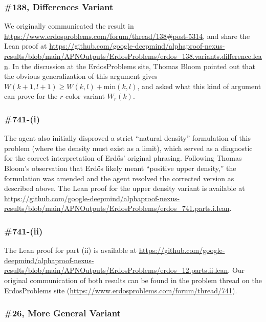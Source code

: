 \subsubsection*{{{\erdos} \#138, Differences Variant}}


We originally communicated the result in \url{https://www.erdosproblems.com/forum/thread/138#post-5314}, and share the Lean proof at \url{https://github.com/google-deepmind/alphaproof-nexus-results/blob/main/APNOutputs/ErdosProblems/erdos_138.variants.difference.lean}. In the discussion at the ErdosProblems site, Thomas Bloom pointed out that the obvious generalization of this argument gives $W(k+1,l+1)\geq W(k,l)+\textrm{min}(k,l)$, and asked what this kind of argument can prove for the $r$-color variant $W_r(k)$.

\subsubsection*{{\erdos} \#741-(i)}


The agent also initially disproved a strict ``natural density'' formulation of this problem (where the density must exist as a limit), which served as a diagnostic for the correct interpretation of Erd\H{o}s' original phrasing. Following Thomas Bloom's observation that Erd\H{o}s likely meant ``positive upper density,'' the formulation was amended and {the agent} resolved the corrected version as described above. The Lean proof for the upper density variant is available at \url{https://github.com/google-deepmind/alphaproof-nexus-results/blob/main/APNOutputs/ErdosProblems/erdos_741.parts.i.lean}.

\subsubsection*{{\erdos} \#741-(ii)}


The Lean proof for part (ii) is available at \url{https://github.com/google-deepmind/alphaproof-nexus-results/blob/main/APNOutputs/ErdosProblems/erdos_12.parts.ii.lean}. Our original communication of both results can be found in the problem thread on the ErdosProblems site (\url{https://www.erdosproblems.com/forum/thread/741}).

\subsubsection*{{\erdos} \#26, More General Variant}


